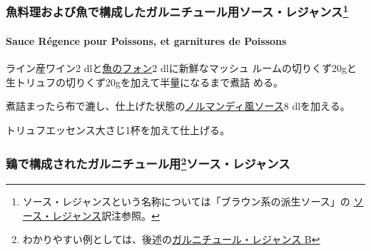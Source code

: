 \begin{recette}
\maeaki

\hypertarget{ux9b5aux6599ux7406ux304aux3088ux3073ux9b5aux3067ux69cbux6210ux3057ux305fux30acux30ebux30cbux30c1ux30e5ux30fcux30ebux7528ux30bdux30fcux30b9ux30ecux30b8ux30e3ux30f3ux30b9119}{%
\subsubsection[魚料理および魚で構成したガルニチュール用ソース・レジャンス]{\texorpdfstring{魚料理および魚で構成したガルニチュール用ソース・レジャンス\footnote{ソース・レジャンスという名称については「ブラウン系の派生ソース」の
  \protect\hyperlink{sauce-regence}{ソース・レジャンス}訳注参照。}}{魚料理および魚で構成したガルニチュール用ソース・レジャンス}}\label{ux9b5aux6599ux7406ux304aux3088ux3073ux9b5aux3067ux69cbux6210ux3057ux305fux30acux30ebux30cbux30c1ux30e5ux30fcux30ebux7528ux30bdux30fcux30b9ux30ecux30b8ux30e3ux30f3ux30b9119}}

\hypertarget{sauce-ruxe9gence-pour-poissons-et-garnitures-de-poissons}{%
\paragraph{Sauce Régence pour Poissons, et garnitures de
Poissons}\label{sauce-ruxe9gence-pour-poissons-et-garnitures-de-poissons}}


ライン産ワイン2 dlと\protect\hyperlink{fumet-de-poisson}{魚のフォン}2
dlに新鮮なマッシュ
ルームの切りくず20gと生トリュフの切りくず20gを加えて半量になるまで煮詰
める。

煮詰まったら布で漉し、仕上げた状態の\protect\hyperlink{sauce-normande}{ノルマンディ風ソース}8
dlを加える。

トリュフエッセンス大さじ1杯を加えて仕上げる。

\maeaki

\hypertarget{ux9d8fux3067ux69cbux6210ux3055ux308cux305fux30acux30ebux30cbux30c1ux30e5ux30fcux30ebux7528120ux30bdux30fcux30b9ux30ecux30b8ux30e3ux30f3ux30b9}{%
\subsubsection[鶏で構成されたガルニチュール用ソース・レジャンス]{\texorpdfstring{鶏で構成されたガルニチュール用\footnote{わかりやすい例としては、後述の\protect\hyperlink{garniture-regence}{ガルニチュール・レジャンス
  B}}ソース・レジャンス}{鶏で構成されたガルニチュール用ソース・レジャンス}}\label{ux9d8fux3067ux69cbux6210ux3055ux308cux305fux30acux30ebux30cbux30c1ux30e5ux30fcux30ebux7528120ux30bdux30fcux30b9ux30ecux30b8ux30e3ux30f3ux30b9}}


\end{recette}
